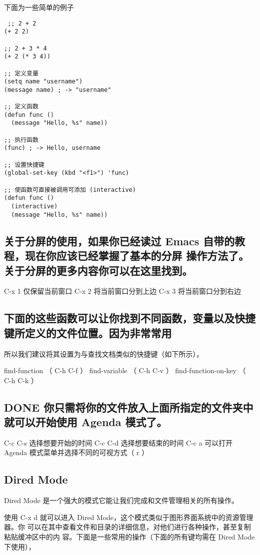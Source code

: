 \documentclass[11pt]{ctexart}
\begin{document}
下面为一些简单的例子
\lstset{language=Lisp,label= ,caption= ,captionpos=b,numbers=none}
\begin{lstlisting}
 ;; 2 + 2
(+ 2 2)

;; 2 + 3 * 4
(+ 2 (* 3 4))

;; 定义变量
(setq name "username")
(message name) ; -> "username"

;; 定义函数
(defun func ()
  (message "Hello, %s" name))

;; 执行函数
(func) ; -> Hello, username

;; 设置快捷键
(global-set-key (kbd "<f1>") 'func)

;; 使函数可直接被调用可添加 (interactive)
(defun func ()
  (interactive)
  (message "Hello, %s" name))
\end{lstlisting}
\subsection{关于分屏的使用，如果你已经读过 Emacs 自带的教程，现在你应该已经掌握了基本的分屏 操作方法了。关于分屏的更多内容你可以在这里找到。}
\label{sec:org6152fdf}


C-x 1 仅保留当前窗口
C-x 2 将当前窗口分到上边
C-x 3 将当前窗口分到右边

\subsection{下面的这些函数可以让你找到不同函数，变量以及快捷键所定义的文件位置。因为非常常用}
\label{sec:org497319d}
所以我们建议将其设置为与查找文档类似的快捷键（如下所示），


find-function （ C-h C-f ）
find-variable （ C-h C-v ）
find-function-on-key （ C-h C-k ）
\subsection{{\bfseries\sffamily DONE} 你只需将你的文件放入上面所指定的文件夹中就可以开始使用 Agenda 模式了。}
\label{sec:org5d81437}
C-c C-s 选择想要开始的时间
C-c C-d 选择想要结束的时间
C-c a 可以打开 Agenda 模式菜单并选择不同的可视方式（ r ）

\subsection{Dired Mode}
\label{sec:org8314d52}

Dired Mode 是一个强大的模式它能让我们完成和文件管理相关的所有操作。

使用 C-x d 就可以进入 Dired Mode，这个模式类似于图形界面系统中的资源管理器。你 可以在其中查看文件和目录的详细信息，对他们进行各种操作，甚至复制粘贴缓冲区中的内 容。下面是一些常用的操作（下面的所有键均需在 Dired Mode 下使用），
\end{document}
